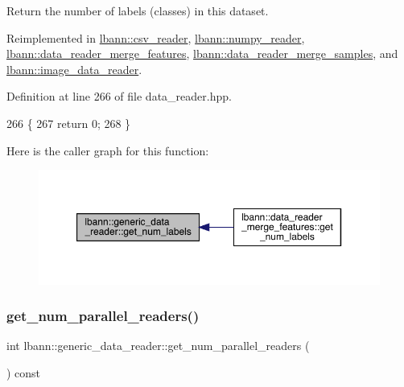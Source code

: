 Return the number of labels (classes) in this dataset. 



Reimplemented in \hyperlink{classlbann_1_1csv__reader_a435acd73d8ef4549fb398d006f26c01c}{lbann\+::csv\+\_\+reader}, \hyperlink{classlbann_1_1numpy__reader_a87510cf16928dc2d5451b10a72d47ce9}{lbann\+::numpy\+\_\+reader}, \hyperlink{classlbann_1_1data__reader__merge__features_a63be746ea35e664b5cc8f8b973e86209}{lbann\+::data\+\_\+reader\+\_\+merge\+\_\+features}, \hyperlink{classlbann_1_1data__reader__merge__samples_a98cb18c29a24358c9a385e29f57c3d57}{lbann\+::data\+\_\+reader\+\_\+merge\+\_\+samples}, and \hyperlink{classlbann_1_1image__data__reader_af821795e5104f1a8c34027de96af7b90}{lbann\+::image\+\_\+data\+\_\+reader}.



Definition at line 266 of file data\+\_\+reader.\+hpp.


\begin{DoxyCode}
266                                      \{
267     \textcolor{keywordflow}{return} 0;
268   \}
\end{DoxyCode}
Here is the caller graph for this function\+:\nopagebreak
\begin{figure}[H]
\begin{center}
\leavevmode
\includegraphics[width=350pt]{classlbann_1_1generic__data__reader_a935ce6262d75f1834e550c3bc16a6547_icgraph}
\end{center}
\end{figure}
\mbox{\label{classlbann_1_1generic__data__reader_ad15887cc31657d03925835aab0d4b675}} 
\subsubsection{\texorpdfstring{get\+\_\+num\+\_\+parallel\+\_\+readers()}{get\_num\_parallel\_readers()}}
{\footnotesize\ttfamily int lbann\+::generic\+\_\+data\+\_\+reader\+::get\+\_\+num\+\_\+parallel\+\_\+readers (\begin{DoxyParamCaption}{ }\end{DoxyParamCaption}) const\hspace{0.3cm}{\ttfamily [inline]}}



